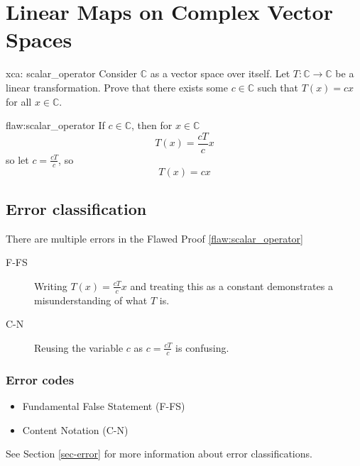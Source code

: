 \section{Linear Maps on Complex Vector Spaces}

\begin{xca}{xca: scalar_operator}
Consider $\mathbb{C}$ as a vector space over itself. Let $T: \mathbb{C} \to \mathbb{C}$ be a linear transformation. Prove that there exists some $c \in \mathbb{C}$ such that $T(x) = cx$ for all $x \in \mathbb{C}$.
\end{xca}

\begin{flaw}{flaw:scalar_operator} %
If $c \in \mathbb{C}$, then for $x \in \mathbb{C}$
$$T(x) = \frac{cT}{c}x $$
so let $c = \frac{cT}{c}$, so
$$T(x) = cx $$

\end{flaw}

\clearpage
\subsection{Error classification}


There are multiple errors
 in the Flawed Proof \ref{flaw:scalar_operator}

 \begin{description}
    \item[F-FS] Writing $T(x) = \frac{cT}{c}x$ and treating this as a constant demonstrates a misunderstanding of what $T$ is.
    \item[C-N] Reusing the variable $c$ as $c = \frac{cT}{c}$ is confusing.

 	
 \end{description}


\subsubsection{Error codes}
\begin{itemize}
    \item Fundamental False Statement (F-FS)
    \item Content Notation (C-N)
\end{itemize}
See Section \ref{sec-error} for more information about error classifications.

